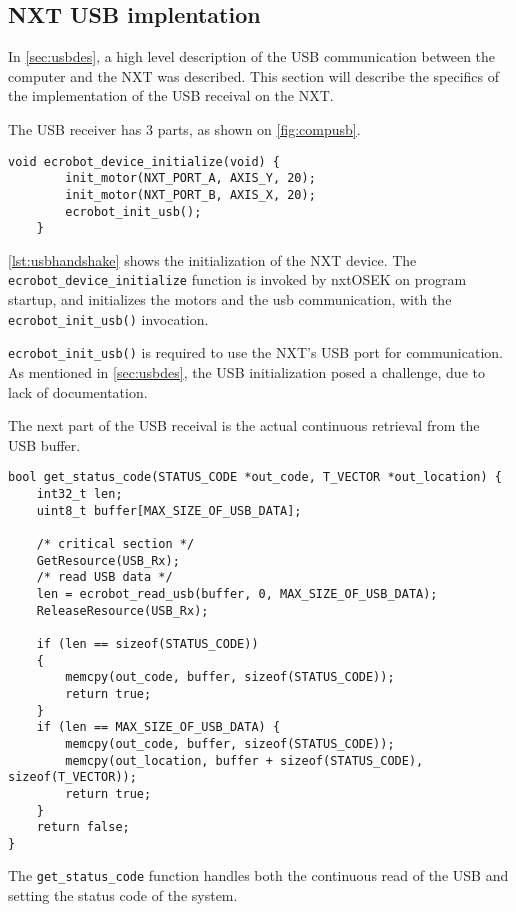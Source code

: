 \subsection{NXT USB implentation}
\label{sec:nxtusbimp}
In \autoref{sec:usbdes}, a high level description of the USB communication between the computer and the NXT was described.
This section will describe the specifics of the implementation of the USB receival on the NXT.

The USB receiver has 3 parts, as shown on \autoref{fig:compusb}.

\begin{lstlisting}[language=CSharp,label={lst:usbhandshake},caption={ecrobot\_device\_initialize method from nxt.c}]
    void ecrobot_device_initialize(void) {
        init_motor(NXT_PORT_A, AXIS_Y, 20);
        init_motor(NXT_PORT_B, AXIS_X, 20);
        ecrobot_init_usb();
    }
\end{lstlisting}


\autoref{lst:usbhandshake} shows the initialization of the NXT device.
The \texttt{ecrobot\_device\_initialize} function is invoked by nxtOSEK on program startup, and initializes the motors and the usb communication, with the \texttt{ecrobot\_init\_usb()} invocation.

\texttt{ecrobot\_init\_usb()} is required to use the NXT's USB port for communication.
As mentioned in \autoref{sec:usbdes}, the USB initialization posed a challenge, due to lack of documentation.

The next part of the USB receival is the actual continuous retrieval from the USB buffer.
\begin{lstlisting}[language=CSharp,label={lst:usbreceive},caption={get\_status\_code method from usb.c}]
bool get_status_code(STATUS_CODE *out_code, T_VECTOR *out_location) {
	int32_t len;
	uint8_t buffer[MAX_SIZE_OF_USB_DATA];

	/* critical section */
	GetResource(USB_Rx);
	/* read USB data */
	len = ecrobot_read_usb(buffer, 0, MAX_SIZE_OF_USB_DATA);
	ReleaseResource(USB_Rx);

	if (len == sizeof(STATUS_CODE))
	{
		memcpy(out_code, buffer, sizeof(STATUS_CODE));
		return true;
	}
	if (len == MAX_SIZE_OF_USB_DATA) {
		memcpy(out_code, buffer, sizeof(STATUS_CODE));
		memcpy(out_location, buffer + sizeof(STATUS_CODE), sizeof(T_VECTOR));
		return true;
	}
	return false;
}
\end{lstlisting}
The \texttt{get\_status\_code} function handles both the continuous read of the USB and setting the status code of the system.

